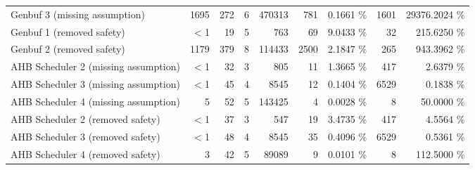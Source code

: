 \begin{tabular}{|l|rr|rr|rr|rr|}
  Genbuf 3 (missing assumption) & 1695 & 272 & 6 & 470313 & 781 &  0.1661 \% & 1601 &  29376.2024 \% \\ 
  Genbuf 1 (removed safety) & $<$1 & 19 & 5 & 763 & 69 &  9.0433 \% & 32 &    215.6250 \% \\ 
  Genbuf 2 (removed safety) & 1179 & 379 & 8 & 114433 & 2500 &  2.1847 \% & 265 &    943.3962 \% \\ 
  AHB Scheduler 2 (missing assumption) & $<$1 & 32 & 3 & 805 & 11 &  1.3665 \% & 417 &      2.6379 \% \\ 
  AHB Scheduler 3 (missing assumption) & $<$1 & 45 & 4 & 8545 & 12 &  0.1404 \% & 6529 &      0.1838 \% \\ 
  AHB Scheduler 4 (missing assumption) & 5 & 52 & 5 & 143425 & 4 &  0.0028 \% & 8 &     50.0000 \% \\ 
  AHB Scheduler 2 (removed safety) & $<$1 & 37 & 3 & 547 & 19 &  3.4735 \% & 417 &      4.5564 \% \\ 
  AHB Scheduler 3 (removed safety) & $<$1 & 48 & 4 & 8545 & 35 &  0.4096 \% & 6529 &      0.5361 \% \\ 
  AHB Scheduler 4 (removed safety) & 3 & 42 & 5 & 89089 & 9 &  0.0101 \% & 8 &    112.5000 \% \\ 
   \hline
\end{tabular}
